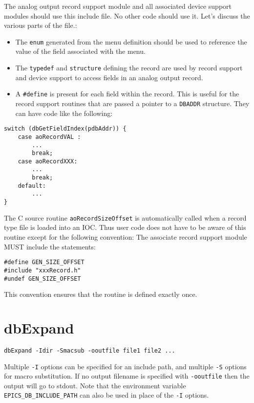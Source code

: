 The analog output record support module and all associated device support modules should use this include file.
No other code should use it.
Let's discuss the various parts of the file.:

\begin{itemize}
\item The \verb|enum| generated from the menu definition should be used to reference the value of the field associated with the menu.

\item The \verb|typedef| and \verb|structure| defining the record are used by record support and device support to access fields in an analog output record.

\item A \verb|#define| is present for each field within the record.
This is useful for the record support routines that are passed a pointer to a \verb|DBADDR| structure.
They can have code like the following:

\end{itemize}

\begin{verbatim}
switch (dbGetFieldIndex(pdbAddr)) {
    case aoRecordVAL :
        ...
        break;
    case aoRecordXXX:
        ...
        break;
    default:
        ...
}
\end{verbatim}

The C source routine \verb|aoRecordSizeOffset| is automatically called when a record type file is loaded into an IOC.
Thus user code does not have to be aware of this routine except for the following convention:
The associate record support module MUST include the statements:

\begin{verbatim}
#define GEN_SIZE_OFFSET
#include "xxxRecord.h"
#undef GEN_SIZE_OFFSET
\end{verbatim}

This convention ensures that the routine is defined exactly once.

\section{dbExpand}

\begin{verbatim}
dbExpand -Idir -Smacsub -ooutfile file1 file2 ...
\end{verbatim}

Multiple \verb|-I| options can be specified for an include path, and multiple \verb|-S| options for macro substitution.
If no output filename is specified with \verb|-ooutfile| then the output will go to stdout.
Note that the environment variable \verb|EPICS_DB_INCLUDE_PATH| can also be used in place of the \verb|-I| options.


